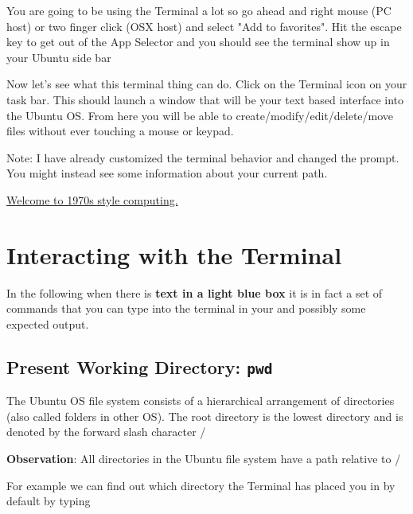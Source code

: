 \FloatBarrier

You are going to be using the Terminal a lot so go ahead and right mouse (PC host) or two finger click (OSX host) and select "Add to favorites". Hit the escape key to get out of the App Selector and you should see the terminal show up in your Ubuntu side bar


\FloatBarrier
Now let's see what this terminal thing can do. Click on the Terminal icon on your task bar. This should launch a window that will be your text based interface into the Ubuntu OS. From here you will be able to create/modify/edit/delete/move files without ever touching a mouse or keypad.


Note: I have already customized the terminal behavior and changed the prompt. You might instead see some information about your current path.

\begin{center}
    \underline{Welcome to 1970s style computing.}
\end{center}

\section{Interacting with the Terminal}

In the following when there is {\bf text in a light blue box} it is in fact a set of commands that you can type into the terminal in your \VB and possibly some expected output. 

\subsection{Present Working Directory: \texttt{pwd}}
The Ubuntu OS file system consists of a hierarchical arrangement of directories (also called folders in other OS). The root directory is the lowest directory and is denoted by the forward slash character /

{\bf Observation}: All directories in the Ubuntu file system have a path relative to /

For example we can find out which directory the Terminal has placed you in by default by typing


